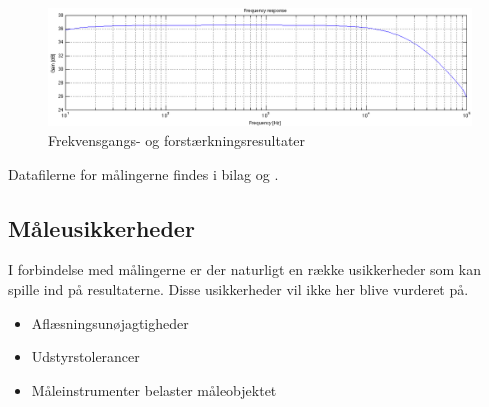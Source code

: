 \begin{figure}[h]
\centering
\includegraphics[width=\textwidth]{maalerapporter/forforstaerker/frekvensrespons-forforstaerker.png}
\caption{Frekvensgangs- og forstærkningsresultater}
\label{fig:fresultat-forforstaerker}
\end{figure}

Datafilerne for målingerne findes i bilag \cite{forforstaerker-3.16mvInputTHDogFrekvensRespons} %
og 
\cite{forforstaerker-31.6mvInputTHDogFrekvensRespons}.%

\subsection*{Måleusikkerheder}
I forbindelse med målingerne er der naturligt en række usikkerheder som kan spille ind på resultaterne. Disse usikkerheder vil ikke her blive vurderet på. 

\begin{itemize}
\item Aflæsningsunøjagtigheder
\item Udstyrstolerancer
\item Måleinstrumenter belaster måleobjektet
\end{itemize}